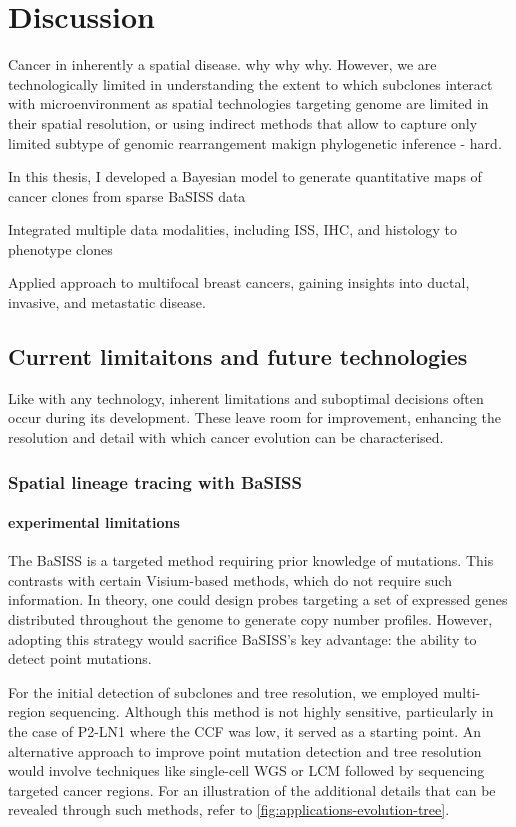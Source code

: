 \chapter{Discussion}
\label{sec:chapter-discussion}

Cancer in inherently a spatial disease. why why why. However, we are technologically limited in understanding the extent to which subclones interact with microenvironment as spatial technologies targeting genome are limited in their spatial resolution, or using indirect methods that allow to capture only limited subtype of genomic rearrangement makign phylogenetic inference - hard.

In this thesis, I developed a Bayesian model to generate quantitative maps of cancer clones from sparse BaSISS data

Integrated multiple data modalities, including ISS, IHC, and histology to phenotype clones

Applied approach to multifocal breast cancers, gaining insights into ductal, invasive, and metastatic disease.

\section{Current limitaitons and future technologies}

Like with any technology, inherent limitations and suboptimal decisions often occur during its development. These leave room for improvement, enhancing the resolution and detail with which cancer evolution can be characterised.

\subsection{Spatial lineage tracing with \ac{BaSISS}}

\subsubsection*{experimental limitations}

The \ac{BaSISS} is a targeted method requiring prior knowledge of mutations. This contrasts with certain Visium-based methods, which do not require such information. In theory, one could design probes targeting a set of expressed genes distributed throughout the genome to generate copy number profiles. However, adopting this strategy would sacrifice BaSISS's key advantage: the ability to detect point mutations.

For the initial detection of subclones and tree resolution, we employed multi-region sequencing. Although this method is not highly sensitive, particularly in the case of P2-LN1 where the \ac{CCF} was low, it served as a starting point. An alternative approach to improve point mutation detection and tree resolution would involve techniques like single-cell \ac{WGS} or \ac{LCM} followed by sequencing targeted cancer regions. For an illustration of the additional details that can be revealed through such methods, refer to \ref{fig:applications-evolution-tree}.

